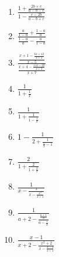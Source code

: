\documentclass{article}
\begin{document}
\begin{enumerate}[label=\bfseries\small 138.\arabic*, itemsep=3cm]
\item $\frac{1 + \frac{2b + c}{a - b - c}}{1 - \frac{c - 2b}{a - b + c}}$ 

\item $\frac{      \frac{a}{1 - a} + \frac{1 - a}{a}    }{   \frac{1 - a}{a} -   \frac{a}{1 - a} }$ 




\item $\frac{\frac{x + 1 - \frac{6x + 12}{x + 2}}{x - 5}}{\frac{x + 4 - \frac{11x - 22}{x + 2}}{x + 7}}$

\item $\frac{1}{1 + \frac{1}{x}}$

\item $\frac{1}{1 + \frac{1}{1 - \frac{1}{x}}}$

\item $1 - \frac{1}{2 + \frac{1}{\frac{x}{3} - 1}}$

\item $\frac{2}{1 + \frac{2}{1 + \frac{2}{x}}}$

\item $\frac{1}{x - \frac{x}{x - \frac{x^2}{x + 1}}}$

\item $\frac{1}{a+2 - \frac{\frac{a+1}{a}}{a - \frac{1}{a}}}$

\item $\frac{x-1}{x+2 - \frac{x^2 + 2}{x - \frac{x-2}{x+1}}}$
\end{enumerate}
\end{document}
